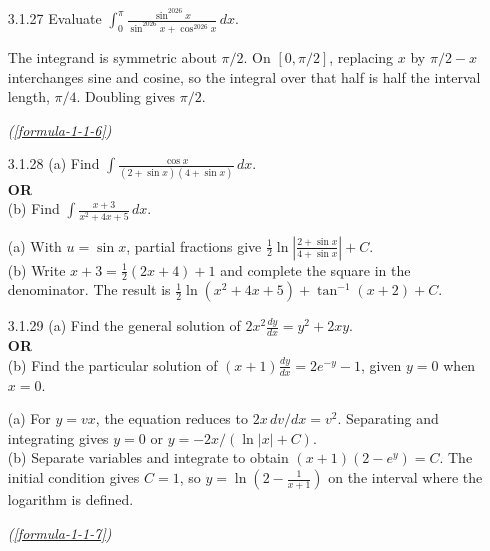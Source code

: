 \begin{enumerate}[label={},leftmargin=1.15cm,labelwidth=1.0cm,labelsep=0.15cm,itemindent=0pt,listparindent=0pt,itemsep=\baselineskip,parsep=0pt,topsep=0pt]
(a) Put $x=t^6$. Then the integral becomes $6\int\frac{t^3}{t+1}\,dt$, giving $\boxed{2\sqrt{x}-3x^{1/3}+6x^{1/6}-6\ln(1+x^{1/6})+C}$.\\
(b) Put $x=\cos\theta$. The radical becomes $\tan(\theta/2)$, and integration by parts gives $\boxed{\frac12x\cos^{-1}x-\frac12\sqrt{1-x^2}+C}$ (on the usual interval $-1<x<1$).\par\noindent\hfill\mbox{\textit{(\ref{formula-1-1-5})}}\par

\item[3.1.27] Evaluate $\displaystyle\int_0^\pi\frac{\sin^{2026}x}{\sin^{2026}x+\cos^{2026}x}\,dx$.

\vspace{0.6em}\par\solution


The integrand is symmetric about $\pi/2$. On $[0,\pi/2]$, replacing $x$ by $\pi/2-x$ interchanges sine and cosine, so the integral over that half is half the interval length, $\pi/4$. Doubling gives $\boxed{\pi/2}$.\par\noindent\hfill\mbox{\textit{(\ref{formula-1-1-6})}}\par

\item[3.1.28]
(a) Find $\displaystyle\int\frac{\cos x}{(2+\sin x)(4+\sin x)}\,dx$.\\
\textbf{OR}\\
(b) Find $\displaystyle\int\frac{x+3}{x^2+4x+5}\,dx$.

\vspace{0.6em}\par\solution

(a) With $u=\sin x$, partial fractions give $\boxed{\frac12\ln\left|\frac{2+\sin x}{4+\sin x}\right|+C}$.\\
(b) Write $x+3=\frac12(2x+4)+1$ and complete the square in the denominator. The result is $\boxed{\frac12\ln(x^2+4x+5)+\tan^{-1}(x+2)+C}$.

\item[3.1.29]
(a) Find the general solution of $2x^2\frac{dy}{dx}=y^2+2xy$.\\
\textbf{OR}\\
(b) Find the particular solution of $(x+1)\frac{dy}{dx}=2e^{-y}-1$, given $y=0$ when $x=0$.

\vspace{0.6em}\par\solution


(a) For $y=vx$, the equation reduces to $2x\,dv/dx=v^2$. Separating and integrating gives $\boxed{y=0}$ or $\boxed{y=-2x/(\ln|x|+C)}$.\\
(b) Separate variables and integrate to obtain $(x+1)(2-e^y)=C$. The initial condition gives $C=1$, so $\boxed{y=\ln\!\left(2-\frac1{x+1}\right)}$ on the interval where the logarithm is defined.\par\noindent\hfill\mbox{\textit{(\ref{formula-1-1-7})}}\par


\end{enumerate}
